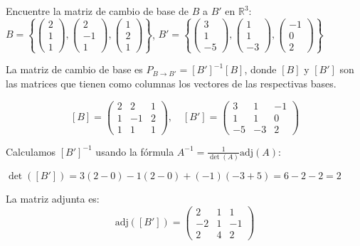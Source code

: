 \begin{prob} Encuentre la matriz de cambio de base de $B$ a $B'$ en $\mathbb{R}^3$: \\
$B=\left\{\begin{pmatrix}2\\1\\1\end{pmatrix}, \begin{pmatrix}2\\-1\\1\end{pmatrix}, \begin{pmatrix}1\\2\\1\end{pmatrix}\right\}$, 
$B'=\left\{\begin{pmatrix}3\\1\\-5\end{pmatrix}, \begin{pmatrix}1\\1\\-3\end{pmatrix}, \begin{pmatrix}-1\\0\\2\end{pmatrix}\right\}$

\begin{myproof}
La matriz de cambio de base es $P_{B\to B'} = [B']^{-1}[B]$, donde $[B]$ y $[B']$ son las matrices que tienen como columnas los vectores de las respectivas bases.

$$[B] = \begin{pmatrix}2&2&1\\1&-1&2\\1&1&1\end{pmatrix}, \quad [B'] = \begin{pmatrix}3&1&-1\\1&1&0\\-5&-3&2\end{pmatrix}$$

Calculamos $[B']^{-1}$ usando la fórmula $A^{-1} = \frac{1}{\det(A)}\text{adj}(A)$:

$\det([B']) = 3(2-0) - 1(2-0) + (-1)(-3+5) = 6 - 2 - 2 = 2$

La matriz adjunta es:
$$\text{adj}([B']) = \begin{pmatrix}2&1&1\\-2&1&-1\\2&4&2\end{pmatrix}$$


\end{myproof}
\end{prob}
